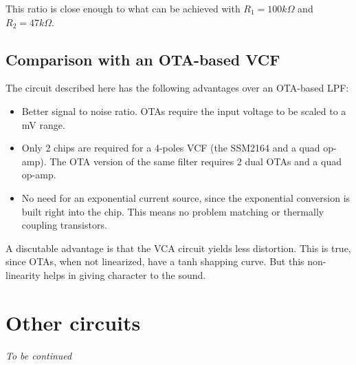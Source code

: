 \documentclass[a4paper,11pt]{article}
\begin{document}
This ratio is close enough to what can be achieved with $R_1 = 100 k\Omega$ and $R_2 = 47 k\Omega$.

\subsection{Comparison with an OTA-based VCF}

The circuit described here has the following advantages over an OTA-based LPF:

\begin{itemize}
\item Better signal to noise ratio. OTAs require the input voltage to be scaled to a mV range.
\item Only 2 chips are required for a 4-poles VCF (the SSM2164 and a quad op-amp). The OTA version of the same filter requires 2 dual OTAs and a quad op-amp.
\item No need for an exponential current source, since the exponential conversion is built right into the chip. This means no problem matching or thermally coupling transistors.
\end{itemize}

A discutable advantage is that the VCA circuit yields less distortion. This is true, since OTAs, when not linearized, have a tanh shapping curve. But this non-linearity helps in giving character to the sound.

\section{Other circuits}

\textit{To be continued}
\end{document}
